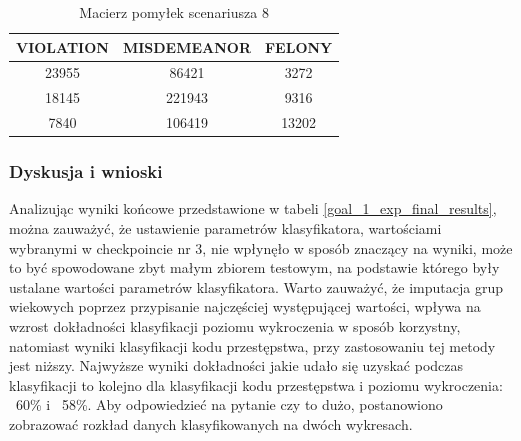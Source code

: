 \documentclass{classrep}
\begin{document}
{{{{                     \begin{table}
                     \small
                     \centering
                     \begin{tabular}{|c|c|c|}
                            \hline
                            VIOLATION & MISDEMEANOR & FELONY\\ \hline
                           23955 & 86421 &  3272\\ \hline
                           18145 & 221943  & 9316\\ \hline
                           7840 & 106419 & 13202 \\ \hline
                        \end{tabular}
                        \caption{Macierz pomyłek scenariusza 8 }
                        \label{goal_1_exp_final_results_matrix_2}
                     \end{table}
                     \FloatBarrier
                     
                }
            }
            
            \subsubsection{Dyskusja i wnioski} {
                Analizując wyniki końcowe przedstawione w tabeli \ref{goal_1_exp_final_results}, można zauważyć, że ustawienie parametrów klasyfikatora, wartościami wybranymi w checkpoincie nr 3, nie wpłynęło w sposób znaczący na wyniki, może to być spowodowane zbyt małym zbiorem testowym, na podstawie którego były ustalane wartości parametrów klasyfikatora. Warto zauważyć, że imputacja grup wiekowych poprzez przypisanie najczęściej występującej wartości, wpływa na wzrost dokładności klasyfikacji poziomu wykroczenia w sposób korzystny, natomiast wyniki klasyfikacji kodu przestępstwa, przy zastosowaniu tej metody jest niższy. Najwyższe wyniki dokładności jakie udało się uzyskać podczas klasyfikacji to kolejno dla klasyfikacji kodu przestępstwa i poziomu wykroczenia: ~60\% i ~58\%. Aby odpowiedzieć na pytanie czy to dużo, postanowiono zobrazować rozkład danych klasyfikowanych na dwóch wykresach.\\
                
}}}
\end{document}
